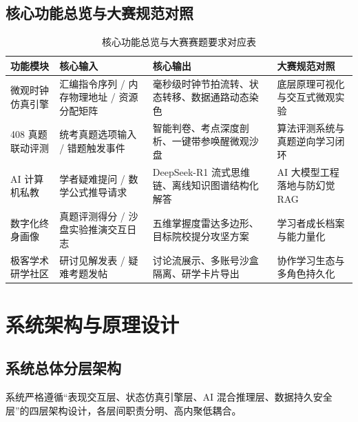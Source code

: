 \documentclass[UTF8,a4paper,11pt]{ctexart}
\begin{document}
\subsection{核心功能总览与大赛规范对照}

\begin{table}[htbp]
\centering
\small
\caption{核心功能总览与大赛赛题要求对应表}
\begin{tabularx}{\textwidth}{p{3.2cm}p{3.2cm}Xp{3cm}}
\toprule
\textbf{功能模块} & \textbf{核心输入} & \textbf{核心输出} & \textbf{大赛规范对照} \\
\midrule
微观时钟仿真引擎 & 汇编指令序列 / 内存物理地址 / 资源分配矩阵 & 毫秒级时钟节拍流转、状态转移、数据通路动态染色 & 底层原理可视化与交互式微观实验 \\
408 真题联动评测 & 统考真题选项输入 / 错题触发事件 & 智能判卷、考点深度剖析、一键带参唤醒微观沙盘 & 算法评测系统与真题逆向学习闭环 \\
AI 计算机私教 & 学者疑难提问 / 数学公式推导请求 & DeepSeek-R1 流式思维链、离线知识图谱结构化解答 & AI 大模型工程落地与防幻觉 RAG \\
数字化终身画像 & 真题评测得分 / 沙盘实验推演交互日志 & 五维掌握度雷达多边形、目标院校提分攻坚方案 & 学习者成长档案与能力量化 \\
极客学术研学社区 & 研讨见解发表 / 疑难考题发帖 & 讨论流展示、多账号沙盒隔离、研学卡片导出 & 协作学习生态与多角色持久化 \\
\bottomrule
\end{tabularx}
\end{table}

\section{系统架构与原理设计}

\subsection{系统总体分层架构}
系统严格遵循“表现交互层、状态仿真引擎层、AI 混合推理层、数据持久安全层”的四层架构设计，各层间职责分明、高内聚低耦合。
\end{document}
